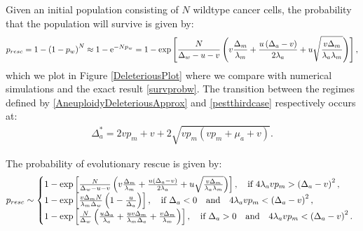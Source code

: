 \documentclass[12pt]{extarticle}
\newcommand{\e}{{\rm e}}
\begin{document}
Given an initial population consisting of $N$ wildtype cancer cells, the probability that the population will survive is given by: 
\begin{align}\label{pestthirdcase}
p_{resc}=1-\left(1-p_w\right)^N\approx 1-\e^{-Np_w}=1-\exp\left[\frac{N}{\Delta_w-u-v}\left(v\frac{\Delta_m}{\lambda_m}+\frac{u\left(\Delta_a-v\right)}{2\lambda_a}+u\sqrt{\frac{v\Delta_m}{\lambda_a\lambda_m}}\right)\right],
\end{align}
which we plot in Figure \ref{DeleteriousPlot} where we compare with numerical simulations and the exact result \eqref{survprobw}. The transition between the regimes defined by \eqref{AneuploidyDeleteriousApprox} and \eqref{pestthirdcase} respectively occurs at:
\begin{align}\label{thresholdvalueaneuploid}
\Delta_a^*=2vp_m+v+2\sqrt{vp_m\left(vp_m+\mu_a+v\right)}.
\end{align}

The probability of evolutionary rescue is given by:
\begin{equation}\label{probresc}
p_{resc}\sim\left\{
  \begin{array}{@{}ll@{}}
  1-\exp\left[\frac{N}{\Delta_w-u-v}\left(v\frac{\Delta_m}{\lambda_m}+\frac{u\left(\Delta_a-v\right)}{2\lambda_a}+u\sqrt{\frac{v\Delta_m}{\lambda_a\lambda_m}}\right)\right],\quad\text{if }4\lambda_avp_m>\left(\Delta_a-v\right)^2,\\
   1-\exp\left[\frac{v\Delta_mN}{\lambda_m\Delta_w}\left(1-\frac{u}{\Delta_a}\right)\right],\quad\text{if }\Delta_a<0\quad\text{and}\quad4\lambda_avp_m<\left(\Delta_a-v\right)^2,\\
   1-\exp\left[\frac{N}{\Delta_w}\left(\frac{u\Delta_a}{\lambda_a}+\frac{uv\Delta_m}{\lambda_m\Delta_a}+\frac{v\Delta_m}{\lambda_m}\right)\right],\quad\text{if }\Delta_a>0\quad\text{and}\quad4\lambda_avp_m<\left(\Delta_a-v\right)^2.
  \end{array}\right.
\end{equation}

\end{document}
